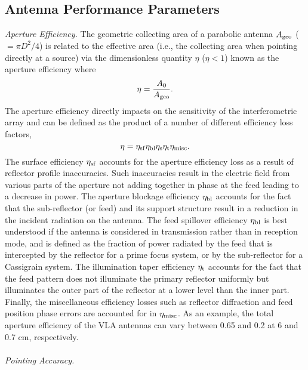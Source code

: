 \subsection{Antenna Performance Parameters}\label{subsec:2.1.3}
\textit{Aperture Efficiency.} The geometric collecting area of a parabolic antenna $A_{\rm{geo}}$ ($=\pi D^2/4$) is related to the effective area (i.e., the collecting area when pointing directly at a source) via the dimensionless quantity $\eta$ ($\eta < 1$) known as the aperture efficiency where
\begin{equation}
\eta = \frac{A_0}{A_{\rm{geo}}}.
\end{equation}
The aperture efficiency directly impacts on the sensitivity of the interferometric array and can be defined as the product of a number of different efficiency loss factors, 
\begin{equation}
\eta = \eta _{\rm{sf}}\eta _{\rm{bl}}\eta _{\rm{s}}\eta _{\rm{t}}\eta _{\rm{misc}}.
\end{equation}
The surface efficiency $\eta _{\rm{sf}}$ accounts for the aperture efficiency loss as a result of reflector profile inaccuracies. Such inaccuracies result in the electric field from various parts of the aperture not adding together in phase at the feed leading to a decrease in power. The aperture blockage efficiency $\eta _{\rm{bl}}$ accounts for the fact that the sub-reflector (or feed) and its support structure result in a reduction in the incident radiation on the antenna. The feed spillover efficiency $\eta _{\rm{bl}}$ is best understood if the antenna is considered in transmission rather than in reception mode, and  is defined as the fraction of power radiated by the feed that is intercepted by the reflector for a prime focus system, or by the sub-reflector for a Cassigrain system. The illumination taper efficiency $\eta _{\rm{t}}$ accounts for the fact that the feed pattern does not illuminate the primary reflector uniformly but illuminates the outer part of the reflector at a lower level than the inner part. Finally, the miscellaneous efficiency losses such as reflector diffraction and feed position phase errors are accounted for in $\eta _{\rm{misc}}$. As an example, the total aperture efficiency of the VLA antennas can vary between 0.65 and 0.2 at 6 and 0.7 cm, respectively.
\\
\\
\textit{Pointing Accuracy.}

